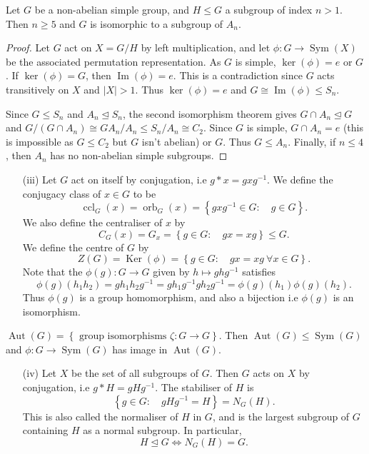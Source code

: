 \documentclass[egregdoesnotlikesansseriftitles,a4paper]{scrartcl}
\begin{document}
 \begin{theorem}
       Let $G$ be a non-abelian simple group, and $H \leq G$ a subgroup of index $n>1$. Then $n \geq 5$ and $G$ is isomorphic to a subgroup of $A_{n}$.
       \begin{proof}
            Let $G$ act on $X=G/H$ by left multiplication, and let $\phi: G \rightarrow \operatorname{Sym}(X)$ be the associated permutation representation. As $G$ is simple, $\operatorname{ker}(\phi)=e$ or $G$. If $\operatorname{ker}(\phi)=G$, then $\operatorname{Im}(\phi)=e$. This is a contradiction since $G$ acts transitively on $X$ and $|X|>1$. Thus $\operatorname{ker}(\phi)=e$ and $G \cong \operatorname{Im}(\phi) \leq S_{n}.$ 
            
            Since $G \leq S_{n}$ and $A_n \unlhd S_n$, the second isomorphism theorem gives $G \cap A_n \unlhd G$ and $G/(G \cap A_n) \cong GA_n/A_n \leq S_n / A_n \cong C_2 $. Since $G$ is simple, $G \cap A_n=e$ (this is impossible as $G \leq C_2 $ but $G$ isn't abelian) or $G$. Thus $G \leq A_{n} $. Finally, if $n \leq 4$, then $A_n$ has no non-abelian simple subgroups.
        \end{proof}
 \end{theorem}
\begin{itemize}
     \item[(iii)] Let $G$ act on itself by conjugation, i.e $g \ast x= gx {g}^{-1}$. We define the conjugacy class of $x \in G$ to be \[
     \operatorname{ccl}_G (x)=\operatorname{orb}_{G}(x)=\left\{gx {g}^{-1} \in G: \quad g \in G\right\}
     .\] We also define the centraliser of $x$ by \[
     C_{G}(x)=G_{x}= \left\{g \in G: \quad gx=xg\right\} \leq G
     .\] We define the centre of $G$ by \[
     Z (G)=\operatorname{Ker}(\phi)=\left\{g \in G: \quad gx=xg \ \forall x \in G\right\}
     .\] Note that the $\phi (g): G \rightarrow G$ given by $h \mapsto gh {g}^{-1}$ satisfies \[
     \phi (g)(h_1 h_2 )=gh_1 h_2 {g}^{-1}=gh_1 {g}^{-1} gh_2 {g}^{-1} =\phi (g)(h_1 )\phi (g)(h_2 )
     .\]  Thus $\phi (g)$ is a group homomorphism, and also a bijection i.e $\phi (g)$ is an isomorphism. 
\end{itemize}
\begin{definition*}[Automorphism]
      $\operatorname{Aut}(G)=\left\{\text{ group isomorphisms } \zeta: G \rightarrow G\right\}$. Then $\operatorname{Aut}(G)\leq \operatorname{Sym}(G)$ and $\phi: G \rightarrow \operatorname{Sym}(G)$ has image in $\operatorname{Aut}(G).$ 
\end{definition*}
\begin{itemize}
     \item[(iv)] Let $X$ be the set of all subgroups of $G$. Then $G$ acts on $X$ by conjugation, i.e $g \ast H=gH {g}^{-1}$. The stabiliser of $H$ is \[
     \left\{g \in G: \quad g H {g}^{-1}=H\right\}=N_{G}(H)
     .\] This is also called the normaliser of $H$ in $G$, and is the largest subgroup of $G$ containing $H$ as a normal subgroup. In particular, \[
     H \unlhd G \iff N_{G}(H) =G
     .\] 
\end{itemize}
\newpage
\end{document}
